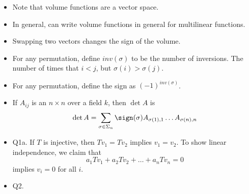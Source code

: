 \documentclass[12pt]{article}
\begin{document}
\begin{itemize}
    \item Note that volume functions are a vector space.

    \item In general, can write volume functions in general for multilinear functions.

    \item Swapping two vectors changes the sign of the volume.

    \item For any permutation, define $inv(\sigma)$ to be the number of inversions.  The number of times that $i < j$, but $\sigma(i) > \sigma(j)$.

    \item For any permutation, define the sign as $(-1)^{inv(\sigma)}$.

    \item If $A_{ij}$ is an $n \times n$ over a field $k$, then $\det A$ is
      \[
        \det A = \sum_{\sigma \in \Sigma_n} \sign(\sigma) A_{\sigma(1), 1} \dots A_{\sigma(n), n}
      \]

    \item Q1a.  If $T$ is injective, then $Tv_1 = Tv_2$ implies $v_1 = v_2$.  To show linear independence, we claim that
      \[
        a_1 Tv_1 + a_2 Tv_2 + \dots + a_n T v_n = 0
        \]
        implies $v_i = 0$ for all $i$.

    \item Q2.

\end{itemize}
\end{document}
